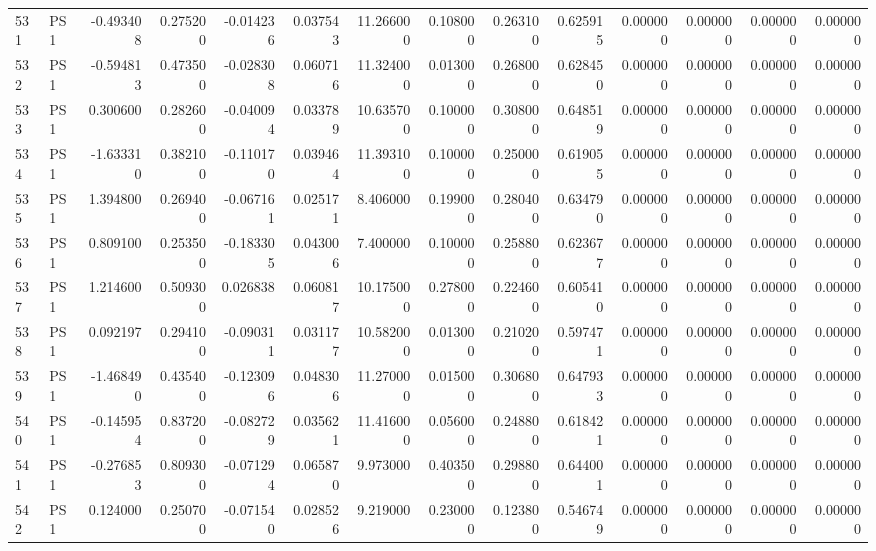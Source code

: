 \begin{tabular}{llrrrrrrrrrrrr}
531 &    PS1 & -0.493408 &      0.275200 & -0.014236 &    0.037543 &  11.266000 &      0.108000 &   0.263100 &  0.625915 &  0.000000 &   0.000000 &     0.000000 &     0.000000 \\
532 &    PS1 & -0.594813 &      0.473500 & -0.028308 &    0.060716 &  11.324000 &      0.013000 &   0.268000 &  0.628450 &  0.000000 &   0.000000 &     0.000000 &     0.000000 \\
533 &    PS1 &  0.300600 &      0.282600 & -0.040094 &    0.033789 &  10.635700 &      0.100000 &   0.308000 &  0.648519 &  0.000000 &   0.000000 &     0.000000 &     0.000000 \\
534 &    PS1 & -1.633310 &      0.382100 & -0.110170 &    0.039464 &  11.393100 &      0.100000 &   0.250000 &  0.619055 &  0.000000 &   0.000000 &     0.000000 &     0.000000 \\
535 &    PS1 &  1.394800 &      0.269400 & -0.067161 &    0.025171 &   8.406000 &      0.199000 &   0.280400 &  0.634790 &  0.000000 &   0.000000 &     0.000000 &     0.000000 \\
536 &    PS1 &  0.809100 &      0.253500 & -0.183305 &    0.043006 &   7.400000 &      0.100000 &   0.258800 &  0.623677 &  0.000000 &   0.000000 &     0.000000 &     0.000000 \\
537 &    PS1 &  1.214600 &      0.509300 &  0.026838 &    0.060817 &  10.175000 &      0.278000 &   0.224600 &  0.605410 &  0.000000 &   0.000000 &     0.000000 &     0.000000 \\
538 &    PS1 &  0.092197 &      0.294100 & -0.090311 &    0.031177 &  10.582000 &      0.013000 &   0.210200 &  0.597471 &  0.000000 &   0.000000 &     0.000000 &     0.000000 \\
539 &    PS1 & -1.468490 &      0.435400 & -0.123096 &    0.048306 &  11.270000 &      0.015000 &   0.306800 &  0.647933 &  0.000000 &   0.000000 &     0.000000 &     0.000000 \\
540 &    PS1 & -0.145954 &      0.837200 & -0.082729 &    0.035621 &  11.416000 &      0.056000 &   0.248800 &  0.618421 &  0.000000 &   0.000000 &     0.000000 &     0.000000 \\
541 &    PS1 & -0.276853 &      0.809300 & -0.071294 &    0.065870 &   9.973000 &      0.403500 &   0.298800 &  0.644001 &  0.000000 &   0.000000 &     0.000000 &     0.000000 \\
542 &    PS1 &  0.124000 &      0.250700 & -0.071540 &    0.028526 &   9.219000 &      0.230000 &   0.123800 &  0.546749 &  0.000000 &   0.000000 &     0.000000 &     0.000000 \\

\end{tabular}
